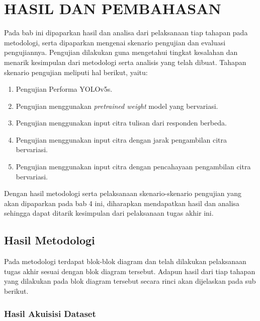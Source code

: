 \chapter{HASIL DAN PEMBAHASAN}
\label{chap:hasilpembahasan}


Pada bab ini dipaparkan hasil dan analisa dari pelaksanaan tiap tahapan pada metodologi, serta dipaparkan mengenai skenario pengujian dan evaluasi pengujiannya. Pengujian dilakukan guna mengetahui tingkat kesalahan dan menarik kesimpulan dari metodologi serta analisis yang telah dibuat. Tahapan skenario pengujian meliputi hal berikut, yaitu: \par

\begin{enumerate}[nolistsep]
  \item Pengujian Performa YOLOv5s.
  \item Pengujian menggunakan \textit{pretrained weight} model yang bervariasi.
  \item Pengujian menggunakan input citra tulisan dari responden berbeda.
  \item Pengujian menggunakan input citra dengan jarak pengambilan citra bervariasi.
  \item Pengujian menggunakan input citra dengan pencahayaan pengambilan citra bervariasi.
\end{enumerate}

Dengan hasil metodologi serta pelaksanaan skenario-skenario pengujian yang akan dipaparkan pada bab 4 ini, diharapkan mendapatkan hasil dan analisa sehingga dapat ditarik kesimpulan dari pelaksanaan tugas akhir ini. \par

\section{Hasil Metodologi}
\label{sec:hasilmetodologi}

Pada metodologi terdapat blok-blok diagram dan telah dilakukan pelaksanaan tugas akhir sesuai dengan blok diagram tersebut. Adapun hasil dari tiap tahapan yang dilakukan pada blok diagram tersebut secara rinci akan dijelaskan pada sub berikut. \par

\subsection{Hasil Akuisisi Dataset}
\label{subsec:Hasilakuisisidataset}

